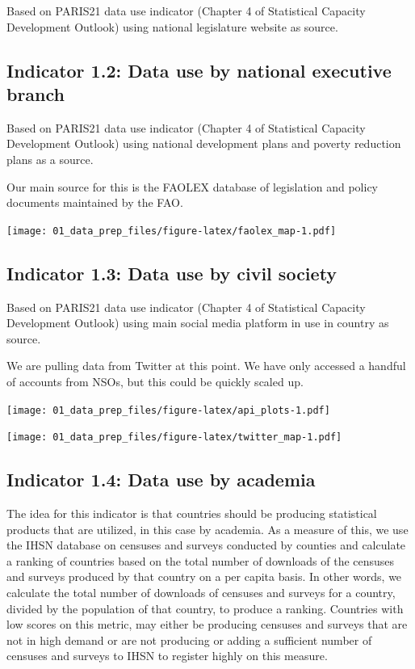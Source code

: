 \documentclass[]{article}
\begin{document}
Based on PARIS21 data use indicator (Chapter 4 of Statistical Capacity
Development Outlook) using national legislature website as source.

\hypertarget{indicator-1.2-data-use-by-national-executive-branch}{%
\subsection{Indicator 1.2: Data use by national executive
branch}\label{indicator-1.2-data-use-by-national-executive-branch}}

Based on PARIS21 data use indicator (Chapter 4 of Statistical Capacity
Development Outlook) using national development plans and poverty
reduction plans as a source.

Our main source for this is the FAOLEX database of legislation and
policy documents maintained by the FAO.

\texttt{[image: 01\_data\_prep\_files/figure-latex/faolex\_map-1.pdf]}

\hypertarget{indicator-1.3-data-use-by-civil-society}{%
\subsection{Indicator 1.3: Data use by civil
society}\label{indicator-1.3-data-use-by-civil-society}}

Based on PARIS21 data use indicator (Chapter 4 of Statistical Capacity
Development Outlook) using main social media platform in use in country
as source.

We are pulling data from Twitter at this point. We have only accessed a
handful of accounts from NSOs, but this could be quickly scaled up.

\texttt{[image: 01\_data\_prep\_files/figure-latex/api\_plots-1.pdf]}

\texttt{[image: 01\_data\_prep\_files/figure-latex/twitter\_map-1.pdf]}

\hypertarget{indicator-1.4-data-use-by-academia}{%
\subsection{Indicator 1.4: Data use by
academia}\label{indicator-1.4-data-use-by-academia}}

The idea for this indicator is that countries should be producing
statistical products that are utilized, in this case by academia. As a
measure of this, we use the IHSN database on censuses and surveys
conducted by counties and calculate a ranking of countries based on the
total number of downloads of the censuses and surveys produced by that
country on a per capita basis. In other words, we calculate the total
number of downloads of censuses and surveys for a country, divided by
the population of that country, to produce a ranking. Countries with low
scores on this metric, may either be producing censuses and surveys that
are not in high demand or are not producing or adding a sufficient
number of censuses and surveys to IHSN to register highly on this
measure.
\end{document}
